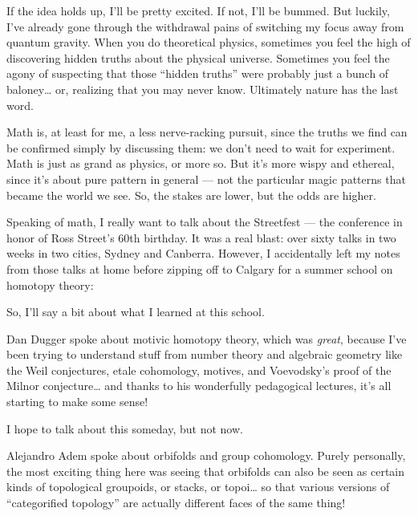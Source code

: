 \documentclass{article}
\def\tightlist{}
\renewcommand{\texttt}[1]{%
  \begingroup
  \ttfamily
  \begingroup\lccode`~=`/\lowercase{\endgroup\def~}{/\discretionary{}{}{}}%
  \begingroup\lccode`~=`[\lowercase{\endgroup\def~}{[\discretionary{}{}{}}%
  \begingroup\lccode`~=`.\lowercase{\endgroup\def~}{.\discretionary{}{}{}}%
  \catcode`/=\active\catcode`[=\active\catcode`.=\active
  \scantokens{#1\noexpand}%
  \endgroup
}
\begin{document}
If the idea holds up, I'll be pretty excited. If not, I'll be bummed.
But luckily, I've already gone through the withdrawal pains of switching
my focus away from quantum gravity. When you do theoretical physics,
sometimes you feel the high of discovering hidden truths about the
physical universe. Sometimes you feel the agony of suspecting that those
``hidden truths'' were probably just a bunch of baloney\ldots{} or,
realizing that you may never know. Ultimately nature has the last word.

Math is, at least for me, a less nerve-racking pursuit, since the truths
we find can be confirmed simply by discussing them: we don't need to
wait for experiment. Math is just as grand as physics, or more so. But
it's more wispy and ethereal, since it's about pure pattern in general
--- not the particular magic patterns that became the world we see. So,
the stakes are lower, but the odds are higher.

Speaking of math, I really want to talk about the Streetfest --- the
conference in honor of Ross Street's 60th birthday. It was a real blast:
over sixty talks in two weeks in two cities, Sydney and Canberra.
However, I accidentally left my notes from those talks at home before
zipping off to Calgary for a summer school on homotopy theory:


So, I'll say a bit about what I learned at this school.

Dan Dugger spoke about motivic homotopy theory, which was \emph{great},
because I've been trying to understand stuff from number theory and
algebraic geometry like the Weil conjectures, etale cohomology, motives,
and Voevodsky's proof of the Milnor conjecture\ldots{} and thanks to his
wonderfully pedagogical lectures, it's all starting to make some sense!

I hope to talk about this someday, but not now.

Alejandro Adem spoke about orbifolds and group cohomology. Purely
personally, the most exciting thing here was seeing that orbifolds can
also be seen as certain kinds of topological groupoids, or stacks, or
topoi\ldots{} so that various versions of ``categorified topology'' are
actually different faces of the same thing!
\end{document}

